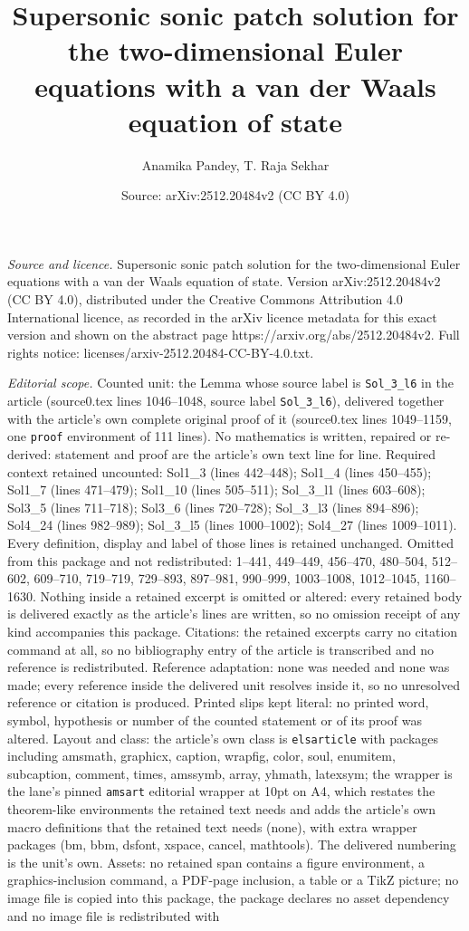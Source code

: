 \documentclass[10pt,a4paper]{amsart}
\title[Supersonic sonic patch solution for the two-dimensional Eule]{Supersonic sonic patch solution for the two-dimensional Euler equations with a van der Waals equation of state}
\author{Anamika Pandey, T. Raja Sekhar}
\date{Source: arXiv:2512.20484v2 (CC BY 4.0)}
\begin{document}
\maketitle

\noindent\emph{Source and licence.} Supersonic sonic patch solution for the two-dimensional Euler equations with a van der Waals equation of state. Version arXiv:2512.20484v2 (CC BY 4.0), distributed under the Creative Commons Attribution 4.0 International licence, as recorded in the arXiv licence metadata for this exact version and shown on the abstract page https://arxiv.org/abs/2512.20484v2. Full rights notice: licenses/arxiv-2512.20484-CC-BY-4.0.txt.\par\smallskip

\noindent\textit{Editorial scope.} Counted unit: the Lemma whose source label is \texttt{Sol\_3\_l6} in the article (source0.tex lines 1046--1048, source label \texttt{Sol\_3\_l6}), delivered together with the article's own complete original proof of it (source0.tex lines 1049--1159, one \texttt{proof} environment of 111 lines). No mathematics is written, repaired or re-derived: statement and proof are the article's own text line for line. Required context retained uncounted: Sol1\_3 (lines 442--448); Sol1\_4 (lines 450--455); Sol1\_7 (lines 471--479); Sol1\_10 (lines 505--511); Sol\_3\_l1 (lines 603--608); Sol3\_5 (lines 711--718); Sol3\_6 (lines 720--728); Sol\_3\_l3 (lines 894--896); Sol4\_24 (lines 982--989); Sol\_3\_l5 (lines 1000--1002); Sol4\_27 (lines 1009--1011). Every definition, display and label of those lines is retained unchanged. Omitted from this package and not redistributed: 1--441, 449--449, 456--470, 480--504, 512--602, 609--710, 719--719, 729--893, 897--981, 990--999, 1003--1008, 1012--1045, 1160--1630. Nothing inside a retained excerpt is omitted or altered: every retained body is delivered exactly as the article's lines are written, so no omission receipt of any kind accompanies this package. Citations: the retained excerpts carry no citation command at all, so no bibliography entry of the article is transcribed and no reference is redistributed. Reference adaptation: none was needed and none was made; every reference inside the delivered unit resolves inside it, so no unresolved reference or citation is produced. Printed slips kept literal: no printed word, symbol, hypothesis or number of the counted statement or of its proof was altered. Layout and class: the article's own class is \texttt{elsarticle} with packages including amsmath, graphicx, caption, wrapfig, color, soul, enumitem, subcaption, comment, times, amssymb, array, yhmath, latexsym; the wrapper is the lane's pinned \texttt{amsart} editorial wrapper at 10pt on A4, which restates the theorem-like environments the retained text needs and adds the article's own macro definitions that the retained text needs (none), with extra wrapper packages (bm, bbm, dsfont, xspace, cancel, mathtools). The delivered numbering is the unit's own. Assets: no retained span contains a figure environment, a graphics-inclusion command, a PDF-page inclusion, a table or a TikZ picture; no image file is copied into this package, the package declares no asset dependency and no image file is redistributed with 
\end{document}
